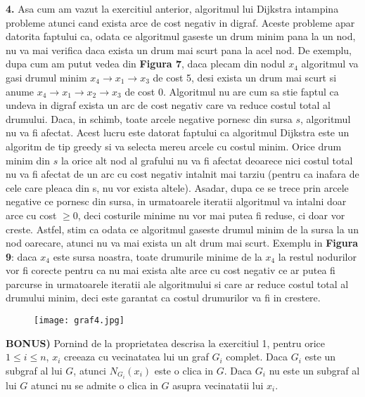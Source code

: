 \documentclass{article}
\begin{document}
\textbf{4.} Asa cum am vazut la exercitiul anterior, algoritmul lui Dijkstra intampina probleme atunci cand exista arce de cost negativ in digraf. Aceste probleme apar datorita faptului ca, odata ce algoritmul gaseste un drum minim pana la un nod, nu va mai verifica daca exista un drum mai scurt pana la acel nod. De exemplu, dupa cum am putut vedea din \textbf{Figura 7}, daca plecam din nodul $x_{4}$ algoritmul va gasi drumul minim  $x_4 \to x_1 \to x_3$ de cost 5, desi exista un drum mai scurt si anume $x_4 \to x_1 \to x_2 \to x_3$
de cost 0. Algoritmul nu are cum sa stie faptul ca undeva in digraf exista un arc de cost negativ care va reduce costul total al drumului. Daca, in schimb, toate arcele negative pornesc din sursa $s$, algoritmul nu va fi afectat. Acest lucru este datorat faptului ca algoritmul Dijkstra este un algoritm de tip greedy si va selecta mereu arcele cu costul minim. Orice drum minim din $s$ la orice alt nod al grafului nu va fi afectat deoarece nici costul total nu va fi afectat de un arc cu cost negativ intalnit mai tarziu (pentru ca inafara de cele care pleaca din s, nu vor exista altele). Asadar, dupa ce se trece prin arcele negative ce pornesc din sursa, in urmatoarele iteratii algoritmul va intalni doar arce cu cost $\geq0$, deci costurile minime nu vor mai putea fi reduse, ci doar vor creste. Astfel, stim ca odata ce algoritmul gaseste drumul minim de la sursa la un nod oarecare, atunci nu va mai exista un alt drum mai scurt. Exemplu in \textbf{Figura 9}: daca $x_4$ este sursa noastra, toate drumurile minime de la $x_4$ la restul nodurilor vor fi corecte pentru ca nu mai exista alte arce cu cost negativ ce ar putea fi parcurse in urmatoarele iteratii ale algoritmului si care ar reduce costul total al drumului minim, deci este garantat ca costul drumurilor va fi in crestere. 
 \begin{figure}[ht]
 \centering
   \begin{minipage}[b]{0.35\linewidth}
           
         
            \caption{}
           
           \texttt{[image: graf4.jpg]}
           
        \end{minipage}
        \end{figure}


\textbf{BONUS)} Pornind de la proprietatea descrisa la exercitiul 1, pentru orice $1\leq i\leq n$, $x_i$ creeaza cu vecinatatea lui un graf $G_i$ complet. Daca $G_i$ este un subgraf al lui $G$, atunci $N_{G_i}(x_i)$ este o clica in $G$. Daca $G_i$ nu este un subgraf al lui $G$ atunci nu se admite o clica in $G$ asupra vecinatatii lui $x_i$.
\end{document}
